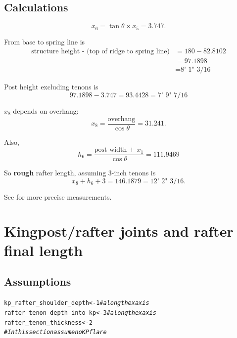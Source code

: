 \documentclass{article}\usepackage[]{graphicx}\usepackage[]{xcolor}
\makeatletter
\newcommand{\hlnum}[1]{\textcolor[rgb]{0.686,0.059,0.569}{#1}}%
\newcommand{\hlcom}[1]{\textcolor[rgb]{0.678,0.584,0.686}{\textit{#1}}}%
\newcommand{\hlstd}[1]{\textcolor[rgb]{0.345,0.345,0.345}{#1}}%
\newcommand{\hlkwb}[1]{\textcolor[rgb]{0.69,0.353,0.396}{#1}}%
\newenvironment{kframe}{%
 \def\at@end@of@kframe{}%
 \ifinner\ifhmode%
  \def\at@end@of@kframe{\end{minipage}}%
  \begin{minipage}{\columnwidth}%
 \fi\fi%
 \def\FrameCommand##1{\hskip\@totalleftmargin \hskip-\fboxsep
 \colorbox{shadecolor}{##1}\hskip-\fboxsep
     \hskip-\linewidth \hskip-\@totalleftmargin \hskip\columnwidth}%
 \MakeFramed {\advance\hsize-\width
   \@totalleftmargin\z@ \linewidth\hsize
   \@setminipage}}%
 {\par\unskip\endMakeFramed%
 \at@end@of@kframe}
\newenvironment{knitrout}{}{} %
\makeatother
\begin{document}
\subsection{Calculations} \label{posts-rafters-calculations}

\begin{center}
\end{center}



\[ x_6 = \tan\theta\times x_5 = 3.747. \]

From base to spring line is 
\begin{align*}
\text{structure height - (top of ridge to spring line)} &= 180 - 82.8102\\
&= 97.1898\\
&= \text{8' 1" 3/16}
\end{align*}

Post height excluding tenons is 
\[ 97.1898 - 3.747 = 93.4428 = \text{7' 9" 7/16}  \]

$x_8$ depends on overhang: 
\[ x_8 = \frac{\text{overhang}}{\cos\theta} = 31.241. \]

Also, 
\[ h_6 = \frac{\text{post width + }x_1}{\cos\theta} = 111.9469 \]

So \textbf{rough} rafter length, assuming 3-inch tenons is 
\[ x_8 + h_6 + 3 = 146.1879 = \text{12' 2" 3/16}.\]

See  for more precise measurements.










\section{Kingpost/rafter joints and rafter final length}\label{kingpost-rafter-joints}

\subsection{Assumptions}  \label{kp-rafter-joints-assumptions}

\begin{knitrout}
\color{fgcolor}\begin{kframe}
\begin{alltt}
\hlstd{kp_rafter_shoulder_depth} \hlkwb{<-} \hlnum{1} \hlcom{# along the x axis}
\hlstd{rafter_tenon_depth_into_kp} \hlkwb{<-} \hlnum{3} \hlcom{# along the x axis}
\hlstd{rafter_tenon_thickness} \hlkwb{<-} \hlnum{2}
\hlcom{# In this section assume no KP flare}
\end{alltt}
\end{kframe}
\end{knitrout}
\end{document}
